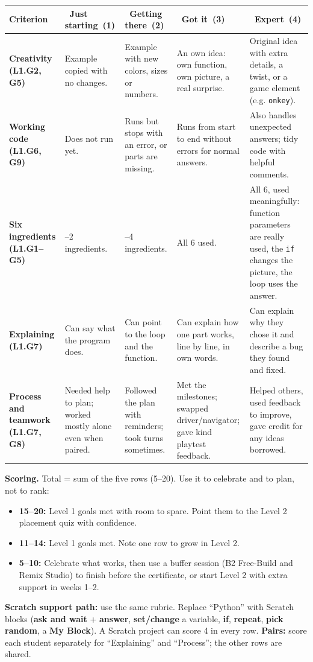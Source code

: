 \documentclass[level=1,teacher]{kidscode}
\newcommand{\lvA}{\faSeedling\ Just starting}
\newcommand{\lvB}{\faShoePrints\ Getting there}
\newcommand{\lvC}{\faCheckCircle\ Got it}
\newcommand{\lvD}{\faRocket\ Expert}
\begin{document}
{\small\renewcommand{\arraystretch}{1.3}
\begin{longtable}{@{}>{\bfseries\RaggedRight}p{2.3cm}*{4}{>{\RaggedRight\arraybackslash}p{}}@{}}
\toprule
Criterion & \lvA\ (1) & \lvB\ (2) & \lvC\ (3) & \lvD\ (4)\\
\midrule\endhead
\bottomrule\endfoot
Creativity (L1.G2, G5) & Example copied with no changes. & Example with new colors, sizes or numbers. & An own idea: own function, own picture, a real surprise. & Original idea with extra details, a twist, or a game element (e.g. \texttt{onkey}).\\
\midrule
Working code (L1.G6, G9) & Does not run yet. & Runs but stops with an error, or parts are missing. & Runs from start to end without errors for normal answers. & Also handles unexpected answers; tidy code with helpful comments.\\
\midrule
Six ingredients (L1.G1--G5) & 1--2 ingredients. & 3--4 ingredients. & All 6 used. & All 6, used meaningfully: function parameters are really used, the \texttt{if} changes the picture, the loop uses the answer.\\
\midrule
Explaining (L1.G7) & Can say what the program does. & Can point to the loop and the function. & Can explain how one part works, line by line, in own words. & Can explain why they chose it and describe a bug they found and fixed.\\
\midrule
Process and teamwork (L1.G7, G8) & Needed help to plan; worked mostly alone even when paired. & Followed the plan with reminders; took turns sometimes. & Met the milestones; swapped driver/navigator; gave kind playtest feedback. & Helped others, used feedback to improve, gave credit for any ideas borrowed.\\
\end{longtable}}

\textbf{Scoring.} Total = sum of the five rows (5--20). Use it to celebrate and to plan, not to rank:
\begin{itemize}[itemsep=1pt]
  \item \textbf{15--20:} Level 1 goals met with room to spare. Point them to the Level 2 placement quiz with confidence.
  \item \textbf{11--14:} Level 1 goals met. Note one row to grow in Level 2.
  \item \textbf{5--10:} Celebrate what works, then use a buffer session (B2 Free-Build and Remix Studio) to finish before the certificate, or start Level 2 with extra support in weeks 1--2.
\end{itemize}
\textbf{Scratch support path:} use the same rubric. Replace \enquote{Python} with Scratch blocks
(\textbf{ask and wait} + \textbf{answer}, \textbf{set/change} a variable, \textbf{if}, \textbf{repeat},
\textbf{pick random}, a \textbf{My Block}). A Scratch project can score 4 in every row.
\textbf{Pairs:} score each student separately for \enquote{Explaining} and \enquote{Process}; the other rows
are shared.
\end{document}
